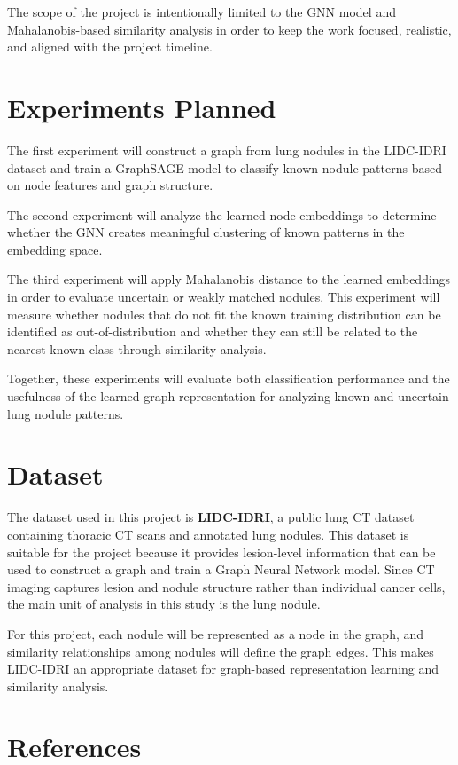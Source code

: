 \documentclass[12pt]{article}
\begin{document}
The scope of the project is intentionally limited to the GNN model and Mahalanobis-based similarity analysis in order to keep the work focused, realistic, and aligned with the project timeline.

\section*{Experiments Planned}

The first experiment will construct a graph from lung nodules in the LIDC-IDRI dataset and train a GraphSAGE model to classify known nodule patterns based on node features and graph structure.

The second experiment will analyze the learned node embeddings to determine whether the GNN creates meaningful clustering of known patterns in the embedding space.

The third experiment will apply Mahalanobis distance to the learned embeddings in order to evaluate uncertain or weakly matched nodules. This experiment will measure whether nodules that do not fit the known training distribution can be identified as out-of-distribution and whether they can still be related to the nearest known class through similarity analysis.

Together, these experiments will evaluate both classification performance and the usefulness of the learned graph representation for analyzing known and uncertain lung nodule patterns.

\section*{Dataset}

The dataset used in this project is \textbf{LIDC-IDRI}, a public lung CT dataset containing thoracic CT scans and annotated lung nodules. This dataset is suitable for the project because it provides lesion-level information that can be used to construct a graph and train a Graph Neural Network model. Since CT imaging captures lesion and nodule structure rather than individual cancer cells, the main unit of analysis in this study is the lung nodule.

For this project, each nodule will be represented as a node in the graph, and similarity relationships among nodules will define the graph edges. This makes LIDC-IDRI an appropriate dataset for graph-based representation learning and similarity analysis.

\section*{References}
\end{document}
